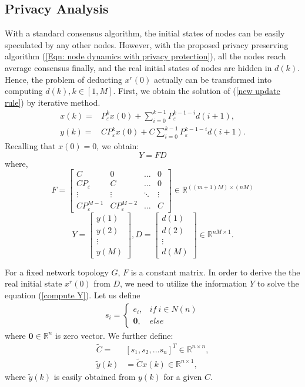 \documentclass[10pt,journal,compsoc]{IEEEtran}
\begin{document}
\subsection{Privacy Analysis}\label{subsection: Privacy Analysis}
With a standard consensus algorithm, the initial states of nodes can be easily speculated by any other nodes. However, with the proposed privacy preserving algorithm (\ref{Eqn: node dynamics with privacy protection}), all the nodes reach average consensus finally, and the real initial states of nodes are hidden in $d(k)$. Hence, the problem of deducting $x^{r}(0)$ actually can be transformed into computing $d(k), k\in [1, M]$. First, we obtain the solution of (\ref{new update rule}) by iterative method.
\begin{equation} \label{solution of update rule}
\begin{split}
x(k)=&P_{\varepsilon}^{k}x(0)+\sum_{i=0}^{k-1}P_{\varepsilon}^{k-1-i}d(i+1), \\
y(k)=&CP_{\varepsilon}^{k}x(0)+C\sum_{i=0}^{k-1}P_{\varepsilon}^{k-1-i}d(i+1).
\end{split}
\end{equation}
Recalling that $x(0)=0$, we obtain:
\begin{equation} \label{compute Y}
Y=FD
\end{equation}
where,
\[
F=\begin{bmatrix}
C & 0 & \dots & 0\\
CP_{\varepsilon} & C &\dots & 0\\
\vdots &\vdots &\ddots & \vdots\\
CP_{\varepsilon}^{M-1}&CP_{\varepsilon}^{M-2} & \dots & C
\end{bmatrix}\in\mathbb{R}^{((m+1)M)\times(nM)}
\]
\[Y=
\begin{bmatrix}
y(1)\\
y(2)\\
\vdots\\
y(M)
\end{bmatrix}, D=
\begin{bmatrix}
d(1)\\
d(2)\\
\vdots\\
d(M)
\end{bmatrix}\in \mathbb{R}^{nM\times1}.
\]

For a fixed network topology $G$, $F$ is a constant matrix. In order to derive the the real initial state $x^{r}(0)$ from $D$, we need to utilize the information $Y$ to solve the equation (\ref{compute Y}).
Let us define
\[
\begin{split}
s_{i}=\begin{cases}
e_{i}, &if\ i\in N(n) \\
\mathbf{0}, &else
\end{cases}
\end{split}
\]
where $\mathbf{0}\in \mathbb{R}^{n}$ is zero vector.
We further define:
\[
\begin{split}
\tilde{C}=&[s_{1}, s_{2}, ...s_{n}]^{T}\in\mathbb{R}^{n\times n},\\
\tilde{y}(k)&=\tilde{C}x(k)\in\mathbb{R}^{n\times 1},
\end{split}
\]
where $\tilde{y}(k)$ is easily obtained from $y(k)$ for a given $C$.
\end{document}
